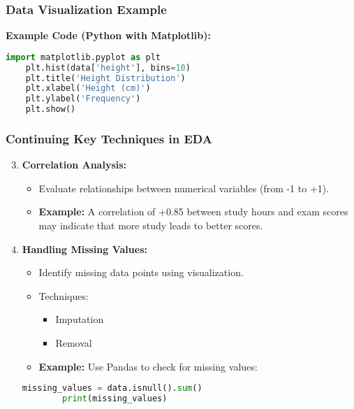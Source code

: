 \documentclass{beamer}
\begin{document}
\begin{frame}[fragile]
    \frametitle{Data Visualization Example}
    \textbf{Example Code (Python with Matplotlib):}
    \begin{lstlisting}[language=Python]
    import matplotlib.pyplot as plt
    plt.hist(data['height'], bins=10)
    plt.title('Height Distribution')
    plt.xlabel('Height (cm)')
    plt.ylabel('Frequency')
    plt.show()
    \end{lstlisting}
\end{frame}

\begin{frame}[fragile]
    \frametitle{Continuing Key Techniques in EDA}
    \begin{enumerate}
        \setcounter{enumi}{2} %
        \item \textbf{Correlation Analysis:}
            \begin{itemize}
                \item Evaluate relationships between numerical variables (from -1 to +1).
                \item \textbf{Example:} A correlation of +0.85 between study hours and exam scores may indicate that more study leads to better scores.
            \end{itemize}
        
        \item \textbf{Handling Missing Values:}
            \begin{itemize}
                \item Identify missing data points using visualization.
                \item Techniques:
                    \begin{itemize}
                        \item Imputation
                        \item Removal
                    \end{itemize}
                \item \textbf{Example:} Use Pandas to check for missing values:
            \end{itemize}
        \begin{lstlisting}[language=Python]
        missing_values = data.isnull().sum()
        print(missing_values)
        \end{lstlisting}
    \end{enumerate}
\end{frame}
\end{document}
